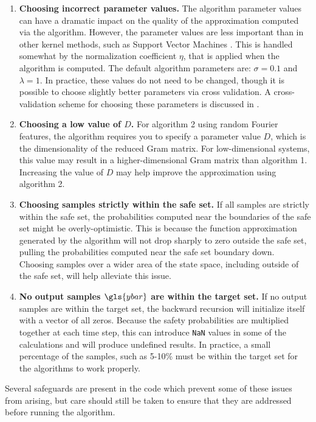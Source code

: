 \documentclass[11pt]{article}
\begin{document}
\begin{enumerate}
  \item
  \textbf{Choosing incorrect parameter values.} The algorithm parameter values
  can have a dramatic impact on the quality of the approximation computed via
  the algorithm. However, the parameter values are less important than in other
  kernel methods, such as Support Vector Machines \cite{vapnik}. This is handled
  somewhat by the normalization coefficient $\eta$, that is applied when the
  algorithm is computed. The default algorithm parameters are: $\sigma = 0.1$
  and $\lambda = 1$. In practice, these values do not need to be changed, though
  it is possible to choose slightly better parameters via cross validation. A
  cross-validation scheme for choosing these parameters is discussed in
  \cite{michelli}.

  \item
  \textbf{Choosing a low value of $D$.} For algorithm 2 using random Fourier features, the algorithm requires you to specify a parameter value $D$, which is the dimensionality of the reduced Gram matrix. For low-dimensional systems, this value may result in a higher-dimensional Gram matrix than algorithm 1. Increasing the value of $D$ may help improve the approximation using algorithm 2.

  \item
  \textbf{Choosing samples strictly within the safe set.} If all samples are
  strictly within the safe set, the probabilities computed near the boundaries
  of the safe set might be overly-optimistic. This is because the function
  approximation generated by the algorithm will not drop sharply to zero outside
  the safe set, pulling the probabilities computed near the safe set boundary
  down. Choosing samples over a wider area of the state space, including outside
  of the safe set, will help alleviate this issue.

  \item
  \textbf{No output samples $\gls{ybar}$ are within the target set.} If no
  output samples are within the target set, the backward recursion will
  initialize itself with a vector of all zeros. Because the safety probabilities
  are multiplied together at each time step, this can introduce \verb|NaN|
  values in some of the calculations and will produce undefined results. In
  practice, a small percentage of the samples, such as 5-10\% must be within the
  target set for the algorithms to work properly.
\end{enumerate}

Several safeguards are present in the code which prevent some of these issues
from arising, but care should still be taken to ensure that they are addressed
before running the algorithm.





\end{document}
